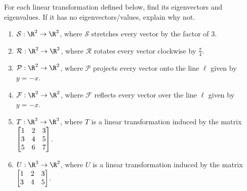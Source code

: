 \begin{exercises}
	\begin{problist}
		\prob For each linear transformation defined below, find its
		eigenvectors and eigenvalues. If it has no eigenvectors/values,
		explain why not.
		\begin{enumerate}
			\item $\mathcal S:\R^{2}\to\R^{2}$, where $\mathcal S$
				stretches every
				vector by the factor of $3$.

			\item $\mathcal R:\R^{2}\to\R^{2}$, where $\mathcal R$  
				rotates every vector
				clockwise by $\frac{\pi}{4}$.

			\item $\mathcal P:\R^{2}\to\R^{2}$, where $\mathcal P$
				projects every vector
				onto the line $\ell$ given by $y=-x$.

			\item $\mathcal F:\R^{2}\to\R^{2}$, where $\mathcal F$
				reflects every
				vector over the line $\ell$ given by $y=-x$.

			\item $T:\R^{3}\to\R^{3}$, where $T$ is a linear
				transformation induced by the matrix
				$\mat{1&2&3\\3&4&5\\5&6&7}$.

			\item $U:\R^{3}\to\R^{2}$, where $U$ is a linear
				transformation induced by the matrix
				$\mat{1&2&3\\3&4&5}$.
		\end{enumerate}


\end{problist}
\end{exercises}
